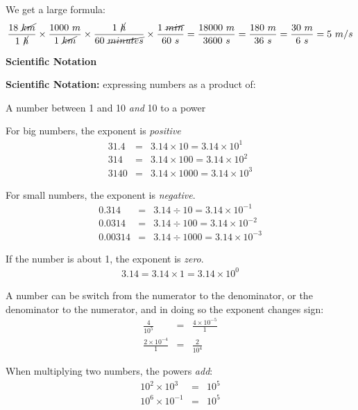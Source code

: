 \documentclass[12pt]{article}
\begin{document}
We get a large formula:
\begin{eqnarray}
\frac{18~\cancel{km}}{1~\cancel{h}}\times\frac{1000~m}{1~\cancel{km}}\times\frac{1~\cancel{h}}{60~\cancel{minutes}}\times\frac{1~\cancel{min}}{60~s} = \frac{18000~m}{3600~s} = \frac{180~m}{36~s} = \frac{30~m}{6~s} = 5~m/s
\end{eqnarray}

\noindent\textbf{\large Scientific Notation}

\textbf{Scientific Notation:} expressing numbers as a product of:

\begin{center}
A number between 1 and 10 \textit{and} 10 to a power
\end{center}

For big numbers, the exponent is \textit{positive}
\begin{eqnarray}
31.4 &=& 3.14 \times 10 = 3.14\times 10^1 \\
314 &=& 3.14 \times 100 = 3.14 \times 10^2 \\
3140 &=& 3.14 \times 1000 = 3.14 \times 10^3
\end{eqnarray}

For small numbers, the exponent is \textit{negative}. 
\begin{eqnarray}
0.314 &=& 3.14 \div 10 = 3.14 \times 10^{-1}\\
0.0314 &=& 3.14 \div 100 = 3.14\times 10^{-2} \\
0.00314 &=& 3.14 \div 1000 = 3.14 \times 10^{-3}
\end{eqnarray}

If the number is about 1, the exponent is \textit{zero}.
\begin{eqnarray}
3.14 = 3.14 \times 1 = 3.14\times 10^0
\end{eqnarray}

A number can be switch from the numerator to the denominator, or the denominator to the numerator, and in doing so the exponent changes sign:
\begin{eqnarray}
\frac{4}{10^{5}} &=& \frac{4\times 10^{-5}}{1} \\
\frac{2\times 10^{-4}}{1} &=& \frac{2}{10^4}
\end{eqnarray}

When multiplying two numbers, the powers \textit{add}:
\begin{eqnarray}
10^{2}\times 10^{3} &=& 10^5 \\
10^{6} \times 10^{-1} &=& 10^5
\end{eqnarray}
\end{document}
